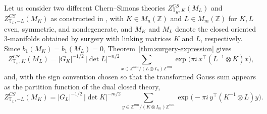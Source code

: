 \documentclass[12pt]{amsart}
\numberwithin{equation}{section}
\theoremstyle{definition}
\begin{document}
Let us consider two different Chern--Simons theories $Z^{CS}_{\mathbb T_K,K}(M_L)$ and  $Z^{CS}_{\mathbb T_L,-L}(M_K)$ as constructed in \cite{Galviz2}, with  $K\in M_n(\mathbb Z)$ and $L\in M_m(\mathbb Z)$  for $K,L$  even, symmetric, and nondegenerate, and $M_K$ and $M_L$ denote the closed oriented $3$-manifolds obtained by surgery with linking matrices $K$ and $L$, respectively. Since $b_1(M_K)=b_1(M_L)=0$, Theorem~\ref{thm:surgery-expression} gives
\begin{equation}
\label{eq:toral-surgery-K-on-L}
Z^{CS}_{\mathbb T_K,K}(M_L)
=
|G_K|^{-1/2}\,|\det L|^{-n/2}
\sum_{x\in \mathbb Z^{mn}/(L\otimes I_n)\mathbb Z^{mn}}
\exp\!\bigl(\pi i\,x^\top(L^{-1}\otimes K)x\bigr),
\end{equation}
and, with the sign convention chosen so that the transformed Gauss sum appears as the partition function of the dual closed theory,
\begin{equation}
\label{eq:toral-surgery-minusL-on-K}
Z^{CS}_{\mathbb T_L,-L}(M_K)
=
|G_L|^{-1/2}\,|\det K|^{-m/2}
\sum_{y\in \mathbb Z^{mn}/(K\otimes I_m)\mathbb Z^{mn}}
\exp\!\bigl(-\pi i\,y^\top(K^{-1}\otimes L)y\bigr).
\end{equation}
\end{document}
